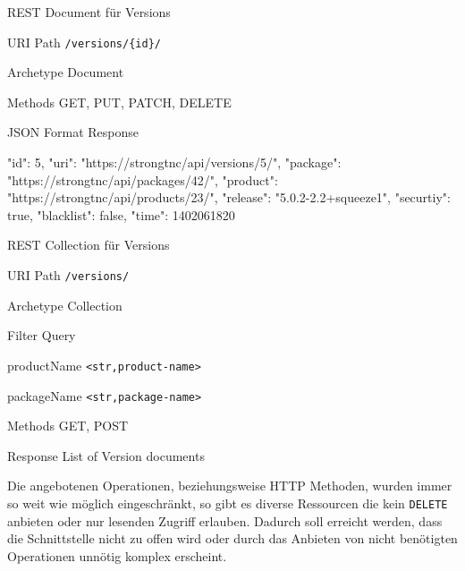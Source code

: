 \begin{listing}[H]
\caption{REST Document für Versions}
\begin{mdframed}[style=def]
\begin{description*}
	\item[URI Path] \texttt{/versions/\{id\}/}
	\item[Archetype] Document
	\item[Methods] GET, PUT, PATCH, DELETE
	\item[JSON Format Response] \hfill
\begin{jsoncode}
{
	"id": 5,
	"uri": "https://strongtnc/api/versions/5/",
	"package": "https://strongtnc/api/packages/42/",
	"product": "https://strongtnc/api/products/23/",
	"release": "5.0.2-2.2+squeeze1",
	"securtiy": true,
	"blacklist": false,
	"time": 1402061820
}
\end{jsoncode}
\end{description*}
\end{mdframed}
\end{listing}

\begin{listing}[H]
\caption{REST Collection für Versions}
\begin{mdframed}[style=def]
\begin{description*}
	\item[URI Path] \texttt{/versions/}
	\item[Archetype] Collection
	\item[Filter Query] \hfill
	\begin{description*}
		\item[productName] \texttt{<str,product-name>}
		\item[packageName] \texttt{<str,package-name>}
	\end{description*}
	\item[Methods] GET, POST
	\item[Response] List of Version documents
\end{description*}
\end{mdframed}
\end{listing}

Die angebotenen Operationen, beziehungsweise HTTP Methoden, wurden immer so weit
wie möglich eingeschränkt, so gibt es diverse Ressourcen die kein
\texttt{DELETE} anbieten oder nur lesenden Zugriff erlauben. Dadurch soll
erreicht werden, dass die Schnittstelle nicht zu offen wird oder durch das
Anbieten von nicht benötigten Operationen unnötig komplex erscheint.

